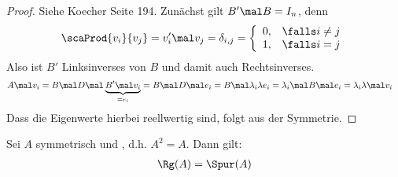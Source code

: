 \begin{proof}
	 Siehe Koecher \cite{koecher2013lineare} Seite 194.\nl
	 Zunächst gilt $B'\mal B=I_n$, denn
	\begin{align*}
		\scaProd{v_i}{v_j}=v_i'\mal v_j=\delta_{i,j}=\left\lbrace\begin{array}{cl}
			0,&\falls i\neq j\\
			1,&\falls i=j
		\end{array}\right.
	\end{align*}
	Also ist $B'$ Linksinverses von $B$ und damit auch Rechtsinverses.
	\begin{align*}
		A\mal v_i
		&=B\mal D\mal\underbrace{B'\mal v_i}_{=e_i}
		=B\mal D\mal e_i
		=B\mal\lambda_i\lambda e_i
		=\lambda_i\mal B\mal e_i
		=\lambda_i\lambda\mal v_i
	\end{align*}
	Dass die Eigenwerte hierbei reellwertig sind, folgt aus der Symmetrie.
\end{proof}

\begin{satz}\label{satz:2.16}
	Sei $A$ symmetrisch und , d.h. $A^2=A$.
	Dann gilt: 
	\begin{align*}
		\Rg(A)=\Spur(A)
	\end{align*}
\end{satz}

